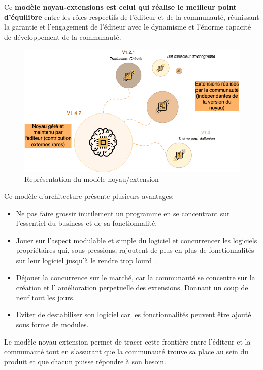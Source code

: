 				Ce \textbf{modèle noyau-extensions est celui qui réalise le meilleur point d'équilibre} entre les rôles respectifs de l'éditeur et de la communauté, réunissant la garantie et l'engagement de l'éditeur avec le dynamisme et l'énorme capacité de développement de la communauté.

				\begin{figure}[ht]
					\center
					\includegraphics[scale=0.60]{./img/noyauextension_os.png}
					\caption{Représentation du modèle noyau/extension}					
				\end{figure}

				Ce modèle d'architecture présente plusieurs avantages:

				\begin{itemize}[label=\textbullet, font=\LARGE \color{burntorange}]
					\item Ne pas faire grossir inutilement un programme en se concentrant sur l'essentiel du business et de sa fonctionnalité.
					\item Jouer sur l'aspect modulable et simple du logiciel et concurrencer les logiciels propriétaires qui, sous pressions, rajoutent de plus en plus de fonctionnalités sur leur logiciel jusqu'à le rendre trop lourd .
					\item Déjouer la concurrence sur le marché, car la communauté se concentre sur la création et l' amélioration perpetuelle des extensions. Donnant un coup de neuf tout les jours.
					\item Eviter de destabiliser son logiciel car les fonctionnalités peuvent être ajouté sous forme de modules.
				\end{itemize}

				Le modèle noyau-extension permet de tracer cette frontière entre l'éditeur et la communauté tout en s'assurant que la communauté trouve sa place au sein du produit et que chacun puisse répondre à son besoin.

